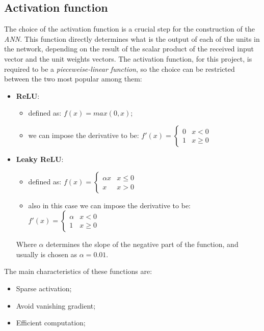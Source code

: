 \subsection{Activation function}
\label{sec:af}
The choice of the activation function is a crucial step for the construction of the \textit{ANN}. This function directly determines what is the output of each of the units in the network, depending on the result of the scalar product of the received input vector and the unit weights vectors.\newline
The activation function, for this project, is required to be a \textit{pieceweise-linear function}, so the choice can be restricted between the two most popular among them:
\begin{itemize}
    \item \textbf{ReLU}:
        \begin{itemize}
            \item defined as: $f(x) = max(0,x)$;
            \item we can impose the derivative to be:
            $f'(x) = \begin{cases} 
                0 & x<0 \\
                1 & x\geq 0 
                \end{cases}$
        \end{itemize}
    \item \textbf{Leaky ReLU}:
        \begin{itemize}
            \item defined as:
            $f(x) = \begin{cases}
                \alpha x & x\leq 0 \\
                x & x>0
            \end{cases}$
            \item also in this case we can impose the derivative to be:
            $f'(x) = \begin{cases}
                \alpha & x<0 \\
                1 & x\geq0
            \end{cases}$
        \end{itemize}
        Where $\alpha$ determines the slope of the negative part of the function, and usually is chosen as $\alpha=0.01$.\newline
\end{itemize}
The main characteristics of these functions are:
\begin{itemize}
    \item Sparse activation;
    \item Avoid vanishing gradient;
    \item Efficient computation;
\end{itemize}

